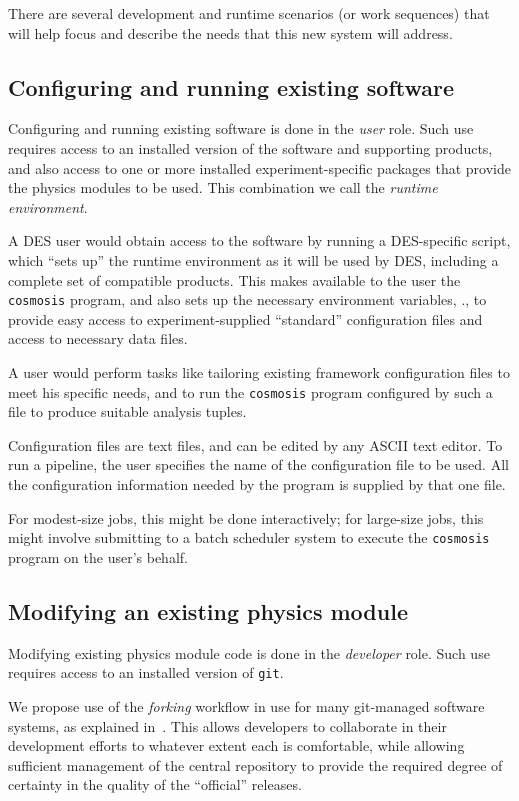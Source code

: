 \documentclass{memarticle}
\newcommand{\prog}[1]%
  {\texttt{#1}}
\newcommand{\cosmosis}{\name{CosmoSIS}\xspace}
\begin{document}
There are several development and runtime scenarios (or work sequences)
that will help focus and describe the needs that this new system will
address.

\subsection{Configuring and running existing software}

Configuring and running existing software is done in the \emph{user}
role. Such use requires access to an installed version of the \cosmosis
software and supporting products, and also access to one or more
installed experiment-specific packages that provide the physics modules
to be used. This combination we call the \emph{runtime environment}.

A DES user would obtain access to the software by running a
DES-specific script, which ``sets up'' the runtime environment as
it will be used by DES, including a complete set of compatible products.
This makes available to the user the \prog{cosmosis} program, and also
sets up the necessary environment variables, \etc., to provide easy
access to experiment-supplied ``standard'' configuration files and
access to necessary data files.

A user would perform tasks like tailoring existing framework
configuration files to meet his specific needs, and to run the
\prog{cosmosis} program configured by such a file to produce suitable analysis
tuples.

Configuration files are text files, and can be edited by any ASCII text
editor. To run a pipeline, the user specifies the name of the
configuration file to be used. All the configuration information needed
by the program is supplied by that one file.

 For modest-size jobs, this might be done
interactively; for large-size jobs, this might involve submitting to
a batch scheduler system to execute the \prog{cosmosis} program on the user's behalf.

\subsection{Modifying an existing physics module\label{sec:modify-an-exist}}

Modifying existing physics module code is done in the
\emph{developer} role. Such use requires access to an
installed version of \prog{git}.

We propose use of the \emph{forking} workflow in use for many
git-managed software systems, as explained
in~\cite{forking-git-workflow}. This allows developers to collaborate in
their development efforts to whatever extent each is comfortable, while
allowing sufficient management of the central repository to provide the
required degree of certainty in the quality of the ``official'' releases.
\end{document}
